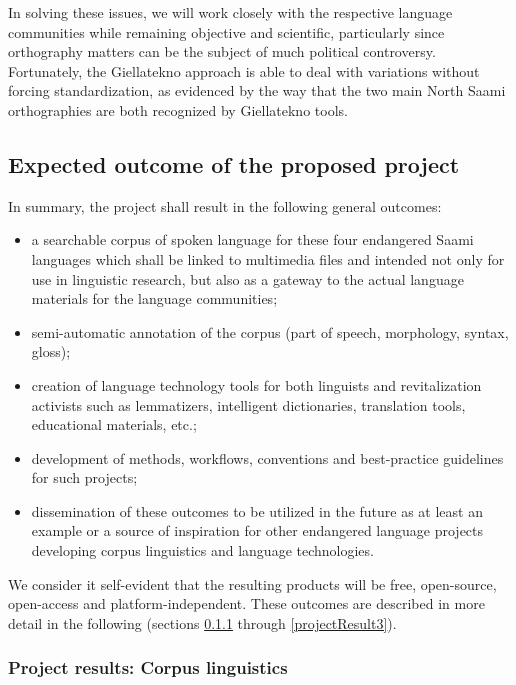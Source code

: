\documentclass[a4paper,12pt]{article}
\begin{document}
In solving these issues, we will work closely with the respective language communities while remaining objective and scientific, particularly since orthography matters can be the subject of much political controversy. Fortunately, the Giellatekno approach is able to deal with variations without forcing standardization, as evidenced by the way that the two main North Saami orthographies are both recognized by Giellatekno tools.

\subsection{Expected outcome of the proposed project}
In summary, the project shall result in the following general outcomes:
\begin{itemize}
\item a searchable corpus of spoken language for these four endangered Saami languages which shall be linked to multimedia files and intended not only for use in linguistic research, but also as a gateway to the actual language materials for the language communities;
\item semi-automatic annotation of the corpus (part of speech, morphology, syntax, gloss);
\item creation of language technology tools for both linguists and revitalization activists such as lemmatizers, intelligent dictionaries, translation tools, educational materials, etc.; 
\item development of methods, workflows, conventions and best-practice guidelines for such projects;
\item dissemination of these outcomes to be utilized in the future as at least an example or a source of inspiration for other endangered language projects developing corpus linguistics and language technologies.
\end{itemize}
We consider it self-evident that the resulting products will be free, open-source, open-access and platform-independent. These outcomes are described in more detail in the following (sections \ref{projectResult1} through \ref{projectResult3}).

\subsubsection{Project results: Corpus linguistics}\label{projectResult1}
\end{document}
